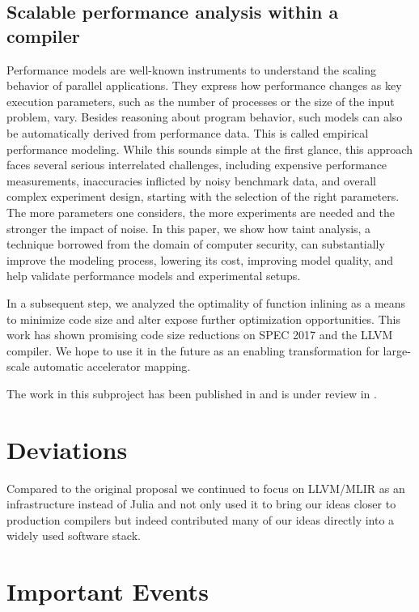 \documentclass[11pt, manuscript,\review anonymous]{acmart}
\begin{document}
\subsection{Scalable performance analysis within a compiler}

Performance models are well-known instruments to understand the scaling
behavior of parallel applications. They express how performance changes as key
execution parameters, such as the number of processes or the size of the input
problem, vary. Besides reasoning about program behavior, such models can also
be automatically derived from performance data. This is called empirical
performance modeling. While this sounds simple at the first glance, this
approach faces several serious interrelated challenges, including expensive
performance measurements, inaccuracies inflicted by noisy benchmark data, and
overall complex experiment design, starting with the selection of the right
parameters. The more parameters one considers, the more experiments are needed
and the stronger the impact of noise. In this paper, we show how taint
analysis, a technique borrowed from the domain of computer security, can
substantially improve the modeling process, lowering its cost, improving model
quality, and help validate performance models and experimental setups.

In a subsequent step, we analyzed the optimality of function inlining as a means
to minimize code size and alter expose further optimization opportunities. This
work has shown promising code size reductions on SPEC 2017 and the LLVM compiler.
We hope to use it in the future as an enabling transformation for large-scale
automatic accelerator mapping.

The work in this subproject has been published in \citet{copic2021} and is under review in
\citet{theo2021}.

\section{Deviations}

Compared to the original proposal we continued to focus on LLVM/MLIR as an
infrastructure instead of Julia and not only used it to bring our ideas closer
to production compilers but indeed contributed many of our ideas directly into
a widely used software stack.

\section{Important Events}
\end{document}
